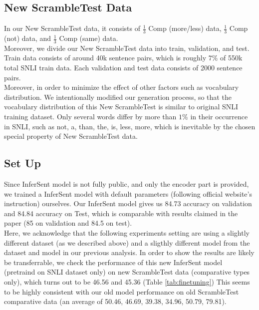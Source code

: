 \documentclass[10pt,letterpaper]{article}
\begin{document}
\subsection{New ScrambleTest Data}
In our New ScrambleTest data, it consists of $\frac{1}{3}$ Comp (more/less) data, $\frac{1}{3}$ Comp (not) data, and $\frac{1}{3}$ Comp (same) data.\\
Moreover, we divide our New ScrambleTest data into train, validation, and test. Train data consists of around 40k sentence pairs, which is roughly $7 \%$ of 550k total SNLI train data. Each validation and test data consists of 2000 sentence pairs.\\
Moreover, in order to minimize the effect of other factors such as vocabulary distribution. We intentionally modified our generation process, so that the vocabulary distribution of this New  ScrambleTest is similar to original SNLI training dataset. Only several words differ by more than %
$1 \%$ in their occurrence in SNLI, such as not, a, than, the, is, less, more, which is inevitable by the chosen special property of New ScrambleTest data.

\subsection{Set Up}
Since InferSent model is not fully public, and only the encoder part is provided, we trained a InferSent model with default parameters (following official website's instruction) ourselves. Our InferSent model gives us 84.73 accuracy on validation and 84.84 accuracy on Test, which is comparable with results claimed in the paper (85 on validation and 84.5 on test).\\

Here, we acknowledge that the following experiments setting are using a slightly different dataset (as we described above) and a sligthly different model from the dataset and model in our previous analysis. In order to show the results are likely be transferrable, we check the performance of this new InferSent model (pretraind on SNLI dataset only) on new ScrambleTest data (comparative types only), which turns out to be 46.56 and 45.36 (Table \ref{tab:finetuning}) This seems to be highly consistent with our old model performance on old ScrambleTest comparative data (an average of 50.46, 46.69, 39.38, 34.96, 50.79, 79.81). 
\end{document}
